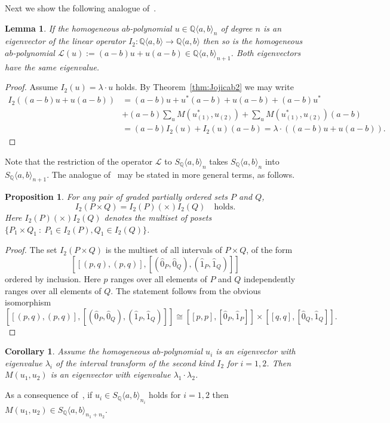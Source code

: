 \documentclass[reqno,12pt]{amsart}
\numberwithin{equation}{section}
\newtheorem{lemma}[theorem]{Lemma}
\newtheorem{proposition}[theorem]{Proposition}
\newtheorem{corollary}[theorem]{Corollary}
\newcommand{\0}{\widehat{0}}
\newcommand{\1}{\widehat{1}}
\newcommand{\2}{\widehat{2}}
\newcommand{\II}{I_2}
\newcommand{\lift}{{\mathcal L}}
\newcommand{\Sym}[1]{S_{\mathbb Q}\langle a,b\rangle_{#1}}
\begin{document}
Next we show the following analogue of~\cite[Proposition
  10.9]{Ehrenborg-Readdy-Tch}.  
\begin{lemma}
\label{lemma:Ulift}  
If the homogeneous $ab$-polynomial $u\in {\mathbb Q}\langle
a,b\rangle_n$ of degree $n$ is an eigenvector of the linear operator
$\II: {\mathbb Q}\langle a,b\rangle \rightarrow {\mathbb Q}\langle
a,b\rangle$ then so is the homogeneous $ab$-polynomial
$\lift(u):=(a-b)u+u(a-b)\in 
{\mathbb Q}\langle a,b\rangle_{n+1}$. Both eigenvectors have the same
eigenvalue.  
\end{lemma}
\begin{proof}
  Assume $\II(u)=\lambda\cdot u$ holds. By
  Theorem~\ref{thm:Jojicab2} we may write 
\begin{align*}
  \II((a-b)u+u(a-b))&=(a-b)u+u^*(a-b)+u(a-b)+(a-b)u^*\\
  &+(a-b)\sum_u M(u_{(1)}^*,u_{(2)})+\sum_u M(u_{(1)}^*,u_{(2)})(a-b)\\
  &=(a-b)\II(u)+\II(u)(a-b)=\lambda\cdot ((a-b)u+u(a-b)). 
\end{align*}    
\end{proof}
Note that the restriction of the operator ${\mathcal L}$ to $\Sym{n}$
takes $\Sym{n}$ into $\Sym{n+1}$. The analogue of~\cite[Proposition
  10.8]{Ehrenborg-Readdy-Tch} may be stated in more general terms, as follows.
\begin{proposition}
  \label{prop:Uprod}
  For any pair of graded partially ordered sets $P$ and $Q$,
  $$
\II(P\times Q)=\II(P) (\times) \II(Q) \quad\mbox{holds.}
$$
Here $\II(P) (\times) \II(Q)$ denotes the multiset of posets
$\{P_1\times Q_1\::\: P_1\in \II(P), Q_1\in \II(Q)\}$. 
\end{proposition}
\begin{proof}
The set $\II(P\times Q)$ is the multiset of all intervals of $P\times
Q$, of the form
$$\left[\left[(p,q),(p,q)\right], \left[(\0_P,\0_Q),(\1_P,\1_Q)\right]\right]$$
ordered by inclusion. Here $p$ ranges over all elements of $P$ and $Q$
independently ranges over all elements of $Q$.
The statement follows from the obvious isomorphism 
$$\left[\left[(p,q),(p,q)\right], \left[(\0_P,\0_Q),(\1_P,\1_Q)\right]\right]\cong
\left[\left[p,p\right],\left[\0_P,\1_P\right]\right]\times \left[\left[q,q\right],\left[\0_Q,\1_Q\right]\right].
$$
\end{proof}  

\begin{corollary}
\label{cor:Uprod}  
Assume the homogeneous $ab$-polynomial $u_i$ is an
eigenvector with eigenvalue $\lambda_i$ of the interval transform of the
second kind $\II$ for $i = 1, 2$. Then $M(u_1, u_2)$ is an eigenvector with 
eigenvalue $\lambda_1\cdot \lambda_2$. 
\end{corollary}  
As a consequence of~\cite[Corollary 4.3]{Ehrenborg-Fox}, if $u_i\in \Sym{n_i}$
holds for $i=1,2$ then  $M(u_1,u_2)\in \Sym{n_1+n_2}$.
\end{document}
